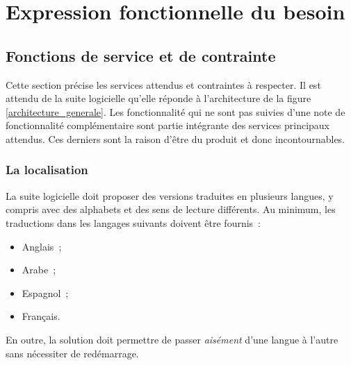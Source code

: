 \chapter{Expression fonctionnelle du besoin}

\section{Fonctions de service et de contrainte}
Cette section précise les services attendus et contraintes à respecter.
Il est attendu de la suite logicielle qu'elle réponde à l'architecture de la figure \ref{architecture_generale}. Les fonctionnalité qui ne sont pas suivies d'une note de fonctionnalité complémentaire sont partie intégrante des services principaux attendus. Ces derniers sont la raison d'être du produit et donc incontournables.

\subsection{La localisation}
La suite logicielle doit proposer des versions traduites en plusieurs langues, y compris avec des alphabets et des sens de lecture différents. Au minimum, les traductions dans les langages suivants doivent être fournis~:
\begin{itemize}
	\item Anglais~;
	\item Arabe~;
	\item Espagnol~;
	\item Français.
\end{itemize}
En outre, la solution doit permettre de passer \emph{aisément} d'une langue à l'autre sans nécessiter de redémarrage.

